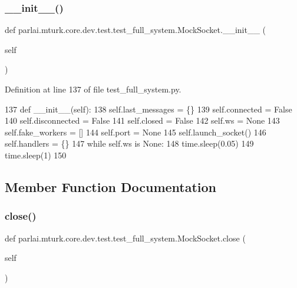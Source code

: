 \subsubsection{\texorpdfstring{\+\_\+\+\_\+init\+\_\+\+\_\+()}{\_\_init\_\_()}}
{\footnotesize\ttfamily def parlai.\+mturk.\+core.\+dev.\+test.\+test\+\_\+full\+\_\+system.\+Mock\+Socket.\+\_\+\+\_\+init\+\_\+\+\_\+ (\begin{DoxyParamCaption}\item[{}]{self }\end{DoxyParamCaption})}



Definition at line 137 of file test\+\_\+full\+\_\+system.\+py.


\begin{DoxyCode}
137     \textcolor{keyword}{def }\_\_init\_\_(self):
138         self.last\_messages = \{\}
139         self.connected = \textcolor{keyword}{False}
140         self.disconnected = \textcolor{keyword}{False}
141         self.closed = \textcolor{keyword}{False}
142         self.ws = \textcolor{keywordtype}{None}
143         self.fake\_workers = []
144         self.port = \textcolor{keywordtype}{None}
145         self.launch\_socket()
146         self.handlers = \{\}
147         \textcolor{keywordflow}{while} self.ws \textcolor{keywordflow}{is} \textcolor{keywordtype}{None}:
148             time.sleep(0.05)
149         time.sleep(1)
150 
\end{DoxyCode}


\subsection{Member Function Documentation}
\mbox{\label{classparlai_1_1mturk_1_1core_1_1dev_1_1test_1_1test__full__system_1_1MockSocket_af4078b6c90d1736d84a0c99aa6bc7bc0}} 
\subsubsection{\texorpdfstring{close()}{close()}}
{\footnotesize\ttfamily def parlai.\+mturk.\+core.\+dev.\+test.\+test\+\_\+full\+\_\+system.\+Mock\+Socket.\+close (\begin{DoxyParamCaption}\item[{}]{self }\end{DoxyParamCaption})}



